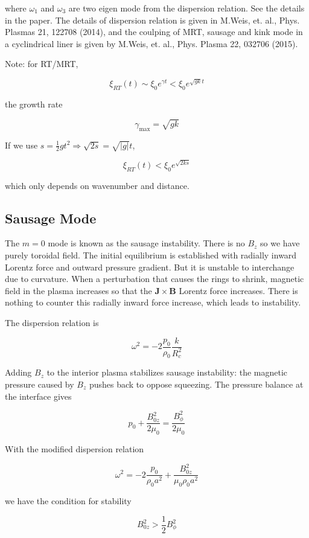 \documentclass[
  notoc %
]{tufte-book}
\begin{document}
where \(\omega_1\) and \(\omega_3\) are two eigen mode from the
dispersion relation. See the details in the paper. The details of
dispersion relation is given in M.Weis, et. al., Phys. Plasmas 21,
122708 (2014), and the coulping of MRT, sausage and kink mode in a
cyclindrical liner is given by M.Weis, et. al., Phys. Plasma 22, 032706
(2015).

Note: for RT/MRT,

\[
\xi_{RT}(t) \sim\xi_0 e^{\gamma t} < \xi_0 e^{\sqrt{gk}t}
\]

the growth rate

\[
\gamma_{\max} = \sqrt{gk}
\]

If we use \(s=\frac{1}{2}gt^2\Rightarrow \sqrt{2s}=\sqrt{|g|}t\),

\[
\xi_{RT}(t)<\xi_0 e^{\sqrt{2ks}}
\]

which only depends on wavenumber and distance.

\hypertarget{sausage-mode}{%
\subsection{Sausage Mode}\label{sausage-mode}}

The \(m=0\) mode is known as the sausage instability. There is no
\(B_z\) so we have purely toroidal field. The initial equilibrium is
established with radially inward Lorentz force and outward pressure
gradient. But it is unstable to interchange due to curvature. When a
perturbation that causes the rings to shrink, magnetic field in the
plasma increases so that the \(\mathbf{J}\times\mathbf{B}\) Lorentz
force increases. There is nothing to counter this radially inward force
increase, which leads to instability.

The dispersion relation is

\[
\omega^2 = -2\frac{p_0}{\rho_0}\frac{k}{R_c^2}
\]

Adding \(B_z\) to the interior plasma stabilizes sausage instability:
the magnetic pressure caused by \(B_z\) pushes back to oppose squeezing.
The pressure balance at the interface gives

\[
p_0 + \frac{B_{0z}^2}{2\mu_0} = \frac{B_\phi^2}{2\mu_0}
\]

With the modified dispersion relation

\[
\omega^2 = -2\frac{p_0}{\rho_0 a^2} + \frac{B_{0z}^2}{\mu_0\rho_0 a^2}
\]

we have the condition for stability

\[
B_{0z}^2 > \frac{1}{2}B_\phi^2
\]
\end{document}
